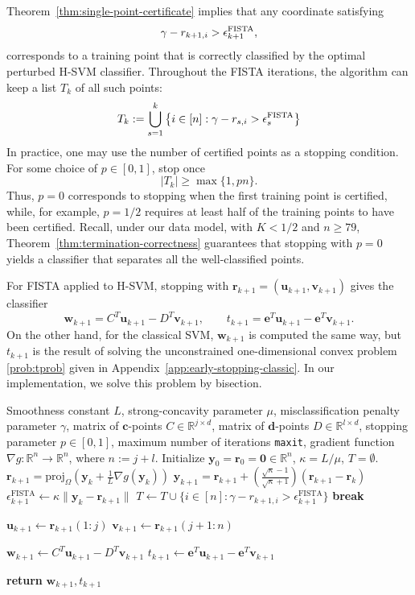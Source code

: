 \documentclass[twoside,11pt]{article}
\newcommand\proj{\mathrm{proj}}
\newcommand\bz{\bm{0}}
\renewcommand{\c}{\bm{c}}
\renewcommand{\d}{\bm{d}}
\newcommand{\R}{{\mathbb{R}}} %
\renewcommand\r{\bm{r}}
\renewcommand\u{\bm{u}}
\renewcommand\v{\bm{v}}
\newcommand\w{\bm{w}}
\newcommand\y{\bm{y}}
\newcommand\e{\bm{e}}
\newcommand\FISTA{\mathrm{FISTA}}
\begin{document}
Theorem~\ref{thm:single-point-certificate} implies that any coordinate satisfying
\[
    \gamma - r_{k+1,i} > \epsilon_{k+1}^{\rm FISTA},
\]
corresponds to a training point that is correctly classified by the optimal perturbed H-SVM classifier. Throughout the FISTA iterations, the algorithm can keep a list $T_k$ of all such points:
\[
    T_k := \bigcup_{s=1}^k \left\{i\in[n]: \gamma-r_{s,i} > \epsilon_s^{\rm FISTA}\right\}
\]
In practice, one may use the number of certified points as a stopping condition. For some choice of $p \in [0,1]$, stop once
\[
    |T_k| \geq \max\{1, p n\}.
\]
Thus, $p = 0$ corresponds to stopping when the first training point is certified, while, for example, $p = 1/2$ requires at least half of the training points to have been certified. Recall, under our data model, with $K < 1/2$ and $n \geq 79$, Theorem~\ref{thm:termination-correctness} guarantees that stopping with $p = 0$ yields a classifier that separates all the well-classified points.

For FISTA applied to H-SVM, stopping with $\r_{k+1}=(\u_{k+1},\v_{k+1})$ gives the classifier
\[
    \w_{k+1} = C^T\u_{k+1}-D^T\v_{k+1}, \qquad t_{k+1}=\e^T\u_{k+1}-\e^T\v_{k+1}.
\]
On the other hand, for the classical SVM, $\w_{k+1}$ is computed the same way, but $t_{k+1}$ is the result of solving the unconstrained one-dimensional convex problem \eqref{prob:tprob} given in Appendix~\ref{app:early-stopping-classic}. In our implementation, we solve this problem by bisection.

\begin{algorithm}[tb]
  \caption{Robustly terminated FISTA for the perturbed H-SVM dual}
  \label{alg:FISTA}
  \begin{algorithmic}
     Smoothness constant $L$, strong-concavity parameter $\mu$, misclassification penalty parameter $\gamma$, matrix of $\c$-points $C \in \R^{j\times d}$, matrix of $\d$-points $D \in \R^{l\times d}$, stopping parameter $p \in [0,1]$, maximum number of iterations \texttt{maxit}, gradient function $\nabla g : \R^n \to \R^n$, where $n := j + l$.
    \State Initialize $\y_0 = \r_0 = \bz \in \R^{n}$, $\kappa = L/\mu$, $T = \emptyset$.
    \State $\r_{k+1} = \proj_{\Omega}\left(\y_k + \frac{1}{L}\nabla g(\y_k)\right)$
    \State $\y_{k+1} = \r_{k+1} + \left(\frac{\sqrt{\kappa} - 1}{\sqrt{\kappa} + 1}\right)(\r_{k+1} - \r_k)$
    \State $\epsilon_{k+1}^{\FISTA} \leftarrow \kappa\lVert \y_k - \r_{k+1}\rVert$
    \State $T \leftarrow T \cup \{i \in [n] : \gamma - r_{k+1,i} > \epsilon^{\FISTA}_{k+1}\}$   
    \State \textbf{break}
    \EndIf
    \EndFor

    \State $\u_{k+1} \leftarrow \r_{k+1}(1:j)$
    \State $\v_{k+1} \leftarrow \r_{k+1}(j+1:n)$

    \State $\w_{k+1} \leftarrow C^T\u_{k+1} - D^T\v_{k+1}$
    \State $t_{k+1} \leftarrow \e^T\u_{k+1} - \e^T\v_{k+1}$

    \State \textbf{return} $\w_{k+1}, t_{k+1}$
  \end{algorithmic}
\end{algorithm}
\end{document}
